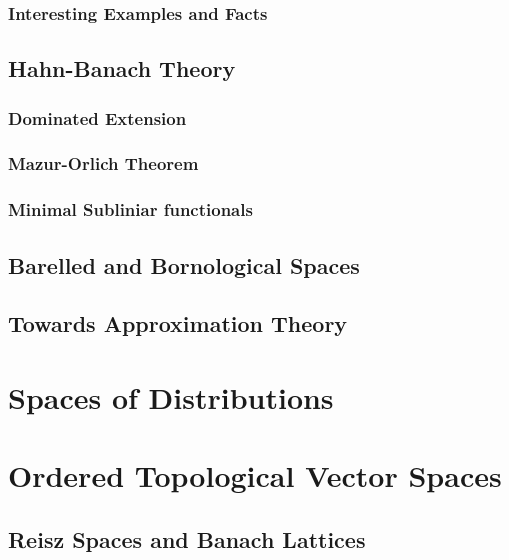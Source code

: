 \documentclass[12pt]{scrartcl}
\renewcommand{\.}{\; . \;}
\begin{document}
\subsubsection{Interesting Examples and Facts}
\subsection{Hahn-Banach Theory}
\subsubsection{Dominated Extension}
\subsubsection{Mazur-Orlich Theorem}
\subsubsection{Minimal Subliniar functionals}
\subsection{Barelled and Bornological Spaces}
\subsection{Towards Approximation Theory}
\section{Spaces of Distributions}
\newpage
\section{Ordered Topological Vector Spaces}
\subsection{Reisz Spaces and Banach Lattices}
\end{document}
